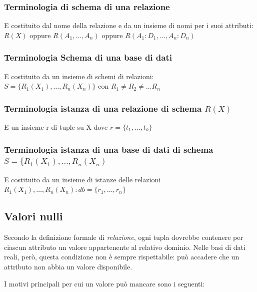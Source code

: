 \subsubsection{Terminologia di schema di una relazione}
E costituito dal nome della relazione e da un insieme di nomi per i suoi attributi:\\
$R(X)$ oppure $R(A_1,\dots,A_n)$ oppure $R(A_1:D_1,\dots,A_n:D_n)$
\subsubsection{Terminologia Schema di una base di dati}
E costituito da un insieme di schemi di relazioni:\\
$S = \{R_1(X_1),\dots,R_n(X_n)\}$ con $R_1 \neq R_2 \neq \dots R_n$
\subsubsection{Terminologia istanza di una relazione di schema $R(X)$}
E un insieme r di tuple su X dove $r = \{ t_1,\dots,t_k \}$
\subsubsection{Terminologia istanza di una base di dati di schema $S = \{R_1(X_1),\dots,R_n(X_n)$}
E costituito da un insieme di istanze delle relazioni $R_1(X_1),\dots,R_n(X_n): db = \{r_1,\dots,r_n\}$
\subsection{Valori nulli}

Secondo la definizione formale di \textit{relazione}, ogni tupla dovrebbe contenere per ciascun attributo un valore appartenente al relativo dominio.  
Nelle basi di dati reali, però, questa condizione non è sempre rispettabile: può accadere che un attributo non abbia un valore disponibile.  

I motivi principali per cui un valore può mancare sono i seguenti:

